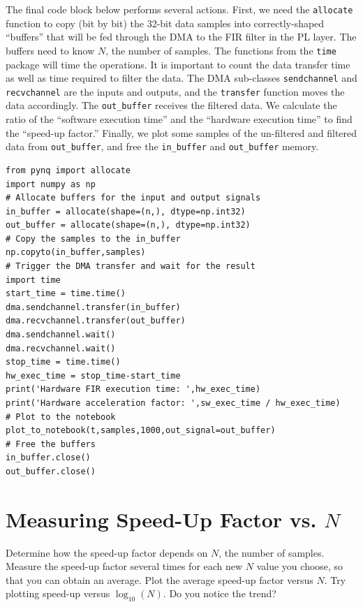 \documentclass{article}
\begin{document}
\noindent
The final code block below performs several actions.  First, we need the \verb+allocate+ function to copy (bit by bit) the 32-bit data samples into correctly-shaped ``buffers'' that will be fed through the DMA to the FIR filter in the PL layer. The buffers need to know $N$, the number of samples.  The functions from the \verb+time+ package will time the operations.  It is important to count the data transfer time as well as time required to filter the data.  The DMA sub-classes \verb+sendchannel+ and \verb+recvchannel+ are the inputs and outputs, and the \verb+transfer+ function moves the data accordingly.  The \verb+out_buffer+ receives the filtered data.  We calculate the ratio of the ``software execution time'' and the ``hardware execution time'' to find the ``speed-up factor.''  Finally, we plot some samples of the un-filtered and filtered data from \verb+out_buffer+, and free the \verb+in_buffer+ and \verb+out_buffer+ memory.

\begin{verbatim}
from pynq import allocate
import numpy as np
# Allocate buffers for the input and output signals
in_buffer = allocate(shape=(n,), dtype=np.int32)
out_buffer = allocate(shape=(n,), dtype=np.int32)
# Copy the samples to the in_buffer
np.copyto(in_buffer,samples)
# Trigger the DMA transfer and wait for the result
import time
start_time = time.time()
dma.sendchannel.transfer(in_buffer)
dma.recvchannel.transfer(out_buffer)
dma.sendchannel.wait()
dma.recvchannel.wait()
stop_time = time.time()
hw_exec_time = stop_time-start_time
print('Hardware FIR execution time: ',hw_exec_time)
print('Hardware acceleration factor: ',sw_exec_time / hw_exec_time)
# Plot to the notebook
plot_to_notebook(t,samples,1000,out_signal=out_buffer)
# Free the buffers
in_buffer.close()
out_buffer.close()
\end{verbatim}

\section{Measuring Speed-Up Factor vs. $N$}

Determine how the speed-up factor depends on $N$, the number of samples.  Measure the speed-up factor several times for each new $N$ value you choose, so that you can obtain an average.  Plot the average speed-up factor versus $N$.  Try plotting speed-up versus $\log_{10}(N)$.  Do you notice the trend?
\end{document}
